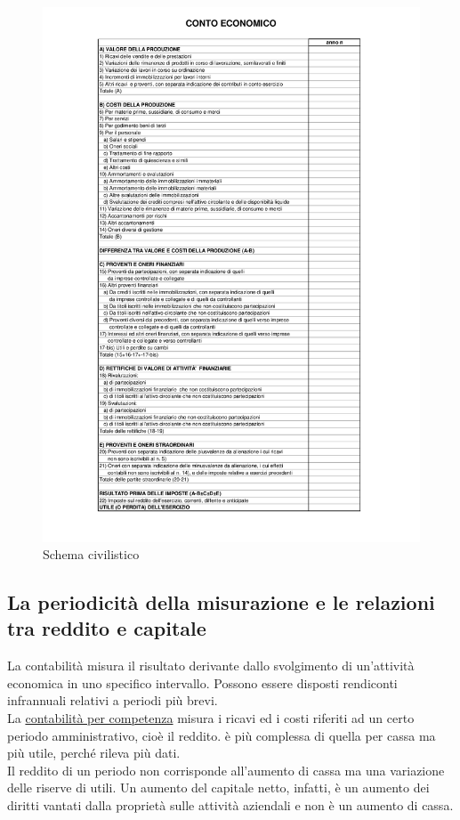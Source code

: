 \documentclass{report}
\begin{document}
	\begin{figure}[H]
		\centering
		\caption{Schema civilistico}
		\label{fig:conto-economico}
		\includegraphics[width=1\linewidth]{images/conto-economico}
	\end{figure}
	\newpage
	\subsection{La periodicità della misurazione e le relazioni tra reddito e capitale}
	La contabilità misura il risultato derivante dallo svolgimento di un'attività economica in uno specifico intervallo. Possono essere disposti rendiconti infrannuali relativi a periodi più brevi.
	\medskip \\
	La \underline{contabilità per competenza} misura i ricavi ed i costi riferiti ad un certo periodo amministrativo, cioè il reddito. è più complessa di quella per cassa ma più utile, perché rileva più dati.
	\medskip \\
	Il reddito di un periodo non corrisponde all'aumento di cassa ma una variazione delle riserve di utili. Un aumento del capitale netto, infatti, è un aumento dei diritti vantati dalla proprietà sulle attività aziendali e non è un aumento di cassa.
\end{document}
